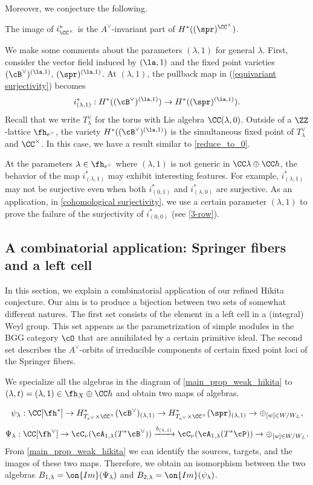 \documentclass[12pt]{amsart}
\begin{document}
 Moreover, we conjecture the following.
\begin{conj} \label{surject h=1}
   The image of $i^{*}_{\CC^\times}$ is the $A^\vee$-invariant part of $H^*((\spr)^{\CC^\times})$.
\end{conj}
We make some comments about the parameters $(\lambda, 1)$ for general $\lambda$. First, consider the vector field induced by $(\la,1)$ and the fixed point varieties $(\cB^\vee)^{(\la,1)}$, $(\spr)^{(\la,1)}$. At $(\lambda,1)$, the pullback map in (\ref{equivariant surjectivity}) becomes
$$i^{*}_{(\lambda, 1)}: H^*((\cB^\vee)^{(\la,1)})\rightarrow H^*((\spr)^{(\la,1)}).$$
Recall that we write $T_{\lambda}^\vee$ for the torus with Lie algebra $\CC(\lambda,0)$. Outside of a $\ZZ$-lattice $\fh_{{e}^\vee}$, the variety $H^*((\cB^\vee)^{(\la,1)})$ is the simultaneous fixed point of $T_{\lambda}^\vee$ and $\CC^\times$. In this case, we have a result similar to \cref{reduce_to_0}.   

At the parameters $\lambda\in \fh_{{e}^\vee}$ where $(\lambda, 1)$ is not generic in $\CC\lambda\oplus \CC\hbar$, the behavior of the map $i^{*}_{(\lambda, 1)}$ may exhibit interesting features. For example, $i^{*}_{(\lambda, 1)}$ may not be surjective even when both $i^{*}_{(0, 1)}$ and $i^{*}_{(\lambda, 0)}$ are surjective. As an application, in \cref{cohomological surjectivity}, we use a certain parameter $(\lambda, 1)$ to prove the failure of the surjectivity of $i^{*}_{(0,0)}$ (see \cref{3-row}). 

\subsection{A combinatorial application: Springer fibers and a left cell}\label{combinatorics}
In this section, we explain a combinatorial application of our refined Hikita conjecture. Our aim is to produce a bijection between two sets of somewhat different natures. The first set consists of the element in a left cell in a (integral) Weyl group. This set appears as the parametrization of simple modules in the BGG category $\cO$ that are annihilated by a certain primitive ideal. The second set describes the $A^\vee$-orbits of irreducible components of certain fixed point loci of the Springer fibers.  

We specialize all the algebras in the diagram of \cref{main_prop_weak_hikita} to $(\lambda, t)= (\lambda,1)\in \fh_X\oplus \CC\hbar$ and obtain two maps of algebras.

    $$\psi_\lambda: \CC[\fh^*]\rightarrow H_{T_{e^\vee}\times \CC^\times}^*(\cB^{\vee})_{(\lambda, 1)}\rightarrow H_{T_{e^\vee}\times \CC^\times}^*(\spr)_{(\lambda, 1)}\rightarrow \oplus_{[w]\in W/W_{L}} ,$$
    $$\Psi_\lambda: \CC[\fh^\vee]\rightarrow \cC_\nu(\cA_{1,\lambda}(T^*\cB^\vee))\xrightarrow{b_{(\lambda,1)}} \cC_\nu(\cA_{1,\lambda}(T^*\cP))\rightarrow \oplus_{[w]\in W/W_{L}}.$$
From \cref{main_prop_weak_hikita} we can identify the sources, targets, and the images of these two maps. Therefore, we obtain an isomorphism between the two algebras $B_{1,\lambda}= \on{Im}( \Psi_\lambda)$ and $B_{2,\lambda}= \on{Im}(\psi_\lambda)$.
\end{document}
